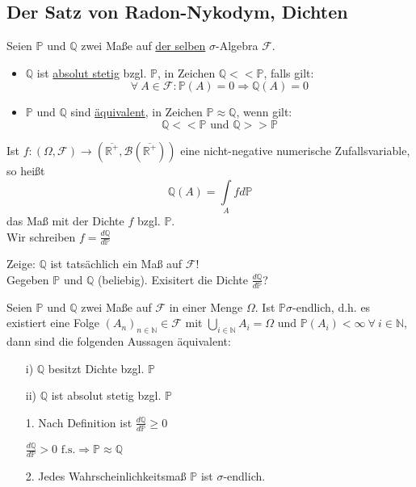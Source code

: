 \subsection{Der Satz von Radon-Nykodym, Dichten}
\begin{Def}
Seien $ \mathbb{P} $ und $ \mathbb{Q} $ zwei Maße auf \underline{der selben} $ \sigma $-Algebra $ \mathcal{F} $.
\begin{itemize}
\item $ \mathbb{Q} $ ist \underline{absolut stetig} bzgl. $ \mathbb{P} $, in Zeichen $ \mathbb{Q}<<\mathbb{P} $, falls gilt:
\[ \forall \ A\in\mathcal F : \mathbb{P}(A)=0\Longrightarrow \mathbb{Q}(A)=0 \]
\item $ \mathbb{P} $ und $ \mathbb{Q} $ sind \underline{äquivalent}, in Zeichen $ \mathbb{P}\approx\mathbb Q $, wenn gilt:
\[ \mathbb{Q}<<\mathbb{P} \text{ und } \mathbb{Q}>>\mathbb{P} \]
\end{itemize}
\end{Def}
\begin{Def}
Ist $ f:(\Omega,\mathcal F)\to(\overline{\mathbb R^{+}},\mathcal{B}(\overline{\mathbb R^{+}})) $ eine nicht-negative numerische Zufallsvariable, so heißt
\[ \mathbb{Q}(A)=\int\limits_{A}fd\mathbb P \]
das Maß mit der Dichte $ f $ bzgl. $ \mathbb{P} $. \\
Wir schreiben $ f=\frac{d\mathbb Q}{d\mathbb P} $
\end{Def}
\begin{hwork}
Zeige: $ \mathbb{Q} $  ist tatsächlich ein Maß auf $ \mathcal{F} $! \\
Gegeben $ \mathbb{P} $ und $ \mathbb{Q} $ (beliebig). Exisitert die Dichte $ \frac{d\mathbb Q}{d\mathbb P} $?
\end{hwork}
\begin{theorem}
Seien $ \mathbb{P} $ und $ \mathbb{Q} $ zwei Maße auf $ \mathcal{F} $ in einer Menge $ \Omega $. Ist $ \mathbb{P} \sigma$-endlich, d.h. es existiert eine Folge $ (A_{n})_{n\in\mathbb N} \in\mathcal F$ mit $ \bigcup\limits_{i\in\mathbb N} A_{i}=\Omega $ und $ \mathbb{P}(A_{i})<\infty \ \forall \ i\in\mathbb N$, dann sind die folgenden Aussagen äquivalent:
\begin{itemize}
\item[i)] $ \mathbb{Q} $ besitzt Dichte bzgl. $ \mathbb{P} $
\item[ii)] $ \mathbb{Q} $ ist absolut stetig bzgl. $ \mathbb{P} $
\end{itemize}
\end{theorem}
\begin{rem}
\begin{enumerate}
\item[]
\item[1.] Nach Definition ist $ \frac{d\mathbb Q}{d\mathbb P}\geq 0 $
\begin{hwork} $ \frac{d\mathbb Q}{d\mathbb P}>0 \text{ f.s.} \Longrightarrow \mathbb{P}\approx \mathbb{Q} $
\end{hwork}
\item[2.] Jedes Wahrscheinlichkeitsmaß $ \mathbb{P} $ ist $ \sigma $-endlich.
\end{enumerate}
\end{rem}

